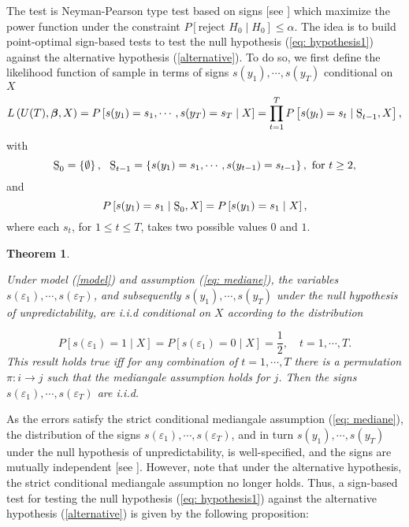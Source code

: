 \documentclass[harvard,11pt]{article}
\newtheorem{theorem}{Theorem}
\begin{document}
The test is Neyman-Pearson type test based on signs [see \citet{lehmann2006testing}] which maximize the
power function under the constraint $P\left[ \text{reject }%
H_{0}\mid H_{0}\right] \leq \alpha$. The idea is to build		
point-optimal sign-based tests to test the null hypothesis (\ref{eq:
hypothesis1}) against the alternative hypothesis (\ref{alternative}). To do
so, we first define the likelihood function of sample in terms of signs $%
s(y_{1}),\cdots,s(y_{T})$ conditional on $X$%
\begin{equation*}
L\left( U(T),\bm{\beta}, X \right) =P\left[
s(y_{1})=s_{1},\cdots,s(y_{T})=s_{T}\mid X\right] =\prod\limits_{t=1}^{T} P\left[ s(y_{t})=s_{t}\mid \text{\b{S}}_{t-1}, X\right] ,
\end{equation*}%
with 
\begin{equation*}
\text{\b{S}}_{0}=\left\{ \emptyset \right\} ,\text{ \ \b{S}}_{t-1}=\left\{
s(y_{1})=s_{1},\cdots,s(y_{t-1})=s_{t-1}\right\} ,\text{ for }t\geq 2,
\end{equation*}%
and%
\begin{equation*}
P\left[ s(y_{1})=s_{1}\mid \text{\b{S}}_{0},X\right] =P%
\left[ s(y_{1})=s_{1}\mid X\right] ,
\end{equation*}%
where each $s_{t}$, for $1\leq t\leq T$, takes two possible values $0$ and $1
$. 


\begin{theorem}\label{Theorem1}
\begin{sloppypar}
Under model (\ref{model}) and assumption (\ref{eq: mediane}), the variables $s(\varepsilon_1),\cdots,s(\varepsilon_T)$, and subsequently $s(y_1),\cdots,s(y_T)$ under the null hypothesis of unpredictability, are i.i.d conditional on $X$ according to the distribution
\end{sloppypar}
\[
P[s(\varepsilon_1)=1\mid X]=P[s(\varepsilon_1)=0\mid X]=\frac{1}{2},\quad t=1,\cdots,T.
\]
This result holds true iff for any combination of $t=1,\cdots,T$ there is a permutation $\pi: i\rightarrow j$ such that the mediangale assumption holds for $j$. Then the signs $s(\varepsilon_1),\cdots,s(\varepsilon_T)$ are i.i.d.

\end{theorem}  As the errors satisfy the strict conditional mediangale assumption (\ref{eq: mediane}), the distribution of the signs $s(\varepsilon_1),\cdots,s(\varepsilon_T)$, and in turn $s(y_1),\cdots, s(y_T)$ under the null hypothesis of unpredictability, is well-specified, and the signs are mutually independent [see \citet{coudin2009finite}]. However, note that under the alternative hypothesis, the strict conditional mediangale assumption no longer holds. Thus, a sign-based test for testing the null hypothesis (\ref{eq: hypothesis1}) against the alternative hypothesis (\ref{alternative}) is given by the following proposition:
\end{document}
